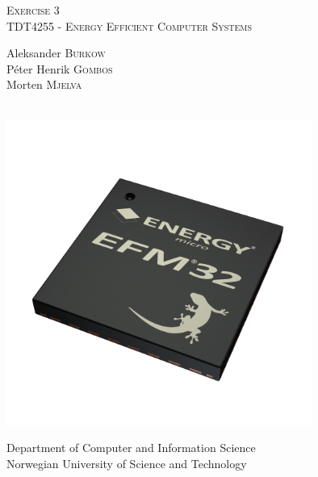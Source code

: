 \begin{titlepage}
  \begin{center}
    \huge
    \noindent\textsc{Exercise 3} \\
    \large
    \noindent\textsc{TDT4255 - Energy Efficient Computer Systems} \\ [2cm]
    \large

    \begin{minipage}{0.4\textwidth}
    \centering
      \noindent Aleksander \textsc{Burkow} \\
      \noindent Péter Henrik \textsc{Gombos} \\
      \noindent Morten \textsc{Mjelva} \\
    \end{minipage} \\[2cm]


    \includegraphics[width=0.75\textwidth]{figures/efm32}

    \vfill

    Department of Computer and Information Science \\
    Norwegian University of Science and Technology \\

  \end{center}
\end{titlepage}
